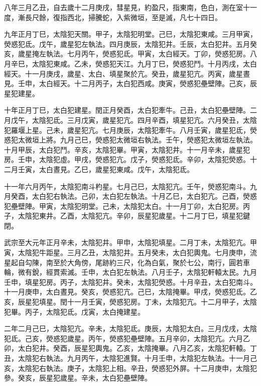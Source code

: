 \begin{pinyinscope}
 八年三月乙丑，自去歲十二月庚戌，彗星見，約盈尺，指東南，色白，測在室十一度，漸長尺餘，復指西北，掃騰蛇，入紫微垣，至是滅，凡七十四日。



 九年正月丁巳，太陰犯天關。甲子，太陰犯明堂。己巳，太陰犯東咸。三月甲寅，熒惑犯氐。戊午，歲星犯左執法。四月庚辰，太陰犯井。壬辰，太白犯井。五月癸亥，歲星掩左執法。七月丙午，熒惑犯氐。甲寅，太白經天。丁卯，熒惑犯房。八月辛巳，太陰犯東咸。乙未，熒惑犯天江。九月丁巳，熒惑犯鬥。十月丙戌，太白經天。十一月庚戌，歲星、太白、填星聚於亢。癸丑，歲星犯亢。丙寅，歲星晝見。壬申，太白經天。十二月丙子，太白犯西咸。庚寅，熒惑犯壘壁陣。己亥，辰星犯建星。



 十年正月丁巳，太白犯建星。閏正月癸酉，太白犯牽牛。己丑，太白犯壘壁陣。二月戊午，太陰犯氐。三月戊寅，歲星犯亢。四月辛酉，填星犯亢。六月癸丑，太陰犯羅堰上星。己未，歲星犯亢。七月庚辰，太陰犯牽牛。八月壬寅，歲星犯氐，熒惑犯太微垣上將。九月己巳，熒惑犯太微垣右執法。壬午，熒惑犯太微垣左執法。十月甲辰，太白犯鬥。辛亥，太陰犯畢。甲寅，太陰犯井。十一月辛未，歲星犯房。壬申，太陰犯虛。甲戌，熒惑犯亢。戊子，熒惑犯氐。辛卯，太陰犯熒惑。十二月壬寅，太白晝見。乙巳，歲星犯東咸。戊午，太陰犯氐。



 十一年六月丙午，太陰犯南斗杓星。七月己巳，太陰犯亢。壬午，熒惑犯南斗。九月癸酉，太白犯右執法。己卯，太白犯左執法。十月乙巳，太白犯亢。己酉，熒惑犯壘壁陣。甲寅，太陰犯明堂。己未，太陰犯太白。十一月丁卯，太白犯房。丙子，太陰犯東井。乙酉，太陰犯亢。辛卯，辰星犯歲星。十二月丁巳，填星犯鍵閉。



 武宗至大元年正月辛未，太陰犯井。甲申，太陰犯填星。二月丁未，太陰犯亢。甲寅，太陰犯牛距星。三月乙丑，太陰犯井。五月癸未，太白犯輿鬼。七月庚申，流星起自勾陳，南至於大角傍，尾跡約三尺，化為白氣，聚於七公，南行，圓若車輪，微有銳，經貫索滅。壬申，太白犯左執法。八月壬子，太陰犯軒轅太民。九月壬申，填星犯房。丙子，太陰犯井。癸未，太陰犯熒惑。十月辛丑，太白犯南斗。十一月庚申，太白晝見。癸亥，熒惑犯亢。己巳，太陰掩畢。甲戌，熒惑犯氐。乙亥，辰星犯填星。閏十一月壬寅，熒惑犯房。丁未，太陰犯亢。十二月甲子，太陰犯畢。丙子，太陰犯氐。戊寅，太白掩建星。



 二年二月己巳，太陰犯亢。辛未，太陰犯氐。庚辰，太陰犯太白。三月戊戌，太陰犯氐。己亥，熒惑犯歲星。丙午，熒惑犯壘壁陣。五月辛卯，太陰犯亢。六月乙卯，太白犯井。癸酉，辰星犯輿鬼。乙亥，太陰掩畢。八月乙亥，太陰犯軒轅。丁丑，太陰犯右執法。九月丙午，太陰犯進賢。十月壬申，太陰犯左執法。十一月己亥，太陰犯右執法。庚子，太陰犯上相。辛丑，熒惑犯外屏。十二月庚申，太陰犯參。癸亥，辰星犯歲星。辛未，太白犯壘壁陣。




\end{pinyinscope}
